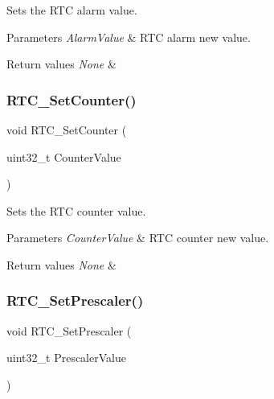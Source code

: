 Sets the R\+TC alarm value. 


\begin{DoxyParams}{Parameters}
{\em Alarm\+Value} & R\+TC alarm new value. \\
\hline
\end{DoxyParams}

\begin{DoxyRetVals}{Return values}
{\em None} & \\
\hline
\end{DoxyRetVals}
\mbox{\label{group___r_t_c___private___functions_gafa81ec17158de1d1a7740eca81b9fb65}} 
\subsubsection{\texorpdfstring{RTC\_SetCounter()}{RTC\_SetCounter()}}
{\footnotesize\ttfamily void R\+T\+C\+\_\+\+Set\+Counter (\begin{DoxyParamCaption}\item[{uint32\+\_\+t}]{Counter\+Value }\end{DoxyParamCaption})}



Sets the R\+TC counter value. 


\begin{DoxyParams}{Parameters}
{\em Counter\+Value} & R\+TC counter new value. \\
\hline
\end{DoxyParams}

\begin{DoxyRetVals}{Return values}
{\em None} & \\
\hline
\end{DoxyRetVals}
\mbox{\label{group___r_t_c___private___functions_gaf76be6071d1ba65b009e0791069e602c}} 
\subsubsection{\texorpdfstring{RTC\_SetPrescaler()}{RTC\_SetPrescaler()}}
{\footnotesize\ttfamily void R\+T\+C\+\_\+\+Set\+Prescaler (\begin{DoxyParamCaption}\item[{uint32\+\_\+t}]{Prescaler\+Value }\end{DoxyParamCaption})}



